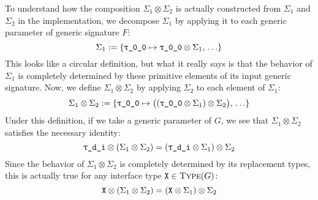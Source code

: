 \documentclass[../generics]{subfiles}
\begin{document}
To understand how the composition $\Sigma_1\otimes\Sigma_2$ is actually constructed from $\Sigma_1$ and $\Sigma_2$ in the implementation, we decompose $\Sigma_1$ by applying it to each generic parameter of generic signature $F$:
\[\Sigma_1 := \SubstMap{\SubstType{\ttgp{0}{0}}{$\ttgp{0}{0}\otimes\Sigma_1$},\,\ldots}\]
This looks like a circular definition, but what it really says is that the behavior of $\Sigma_1$ is completely determined by these primitive elements of its input generic signature. Now, we define $\Sigma_1\otimes\Sigma_2$ by applying $\Sigma_2$ to each element of $\Sigma_1$:
\[
\Sigma_1\otimes\Sigma_2 := \SubstMap{
\SubstType{\ttgp{0}{0}}{$\bigl((\ttgp{0}{0}\otimes\Sigma_1)\otimes\Sigma_2\bigr)$},\,
\ldots
}
\]
Under this definition, if we take a generic parameter  of $G$, we see that $\Sigma_1\otimes\Sigma_2$ satisfies the necessary identity:
\[
\ttgp{d}{i}\otimes(\Sigma_1\otimes\Sigma_2)=(\ttgp{d}{i}\otimes\Sigma_1)\otimes\Sigma_2
\]
Since the behavior of $\Sigma_1\otimes\Sigma_2$ is completely determined by its replacement types, this is actually true for any interface type $\texttt{X}\in\textsc{Type}({G})$:
\[\texttt{X}\otimes(\Sigma_1\otimes\Sigma_2)=(\texttt{X}\otimes\Sigma_1)\otimes\Sigma_2\]

\newcommand{\FirstMapInExample}{\SubstMap{
\SubstType{T}{Array<A>},\,\SubstType{U}{A}
}}
\newcommand{\SecondMapInExample}{\SubstMap{
\SubstType{A}{Int}
}}
\newcommand{\ThirdMapInExample}{\SubstMap{
\SubstType{T}{Array<Int>},\,\SubstType{U}{Int}
}}
\end{document}
